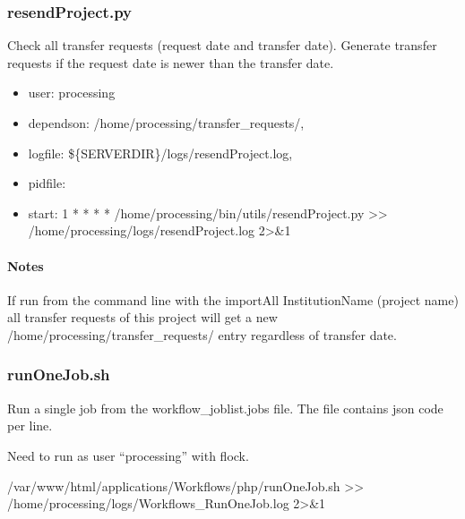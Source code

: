 \documentclass[letterpaper,10pt,english]{sphinxmanual}
\begin{document}
\subsubsection{resendProject.py}
\label{\detokenize{Architecture/scripts/resendProject:resendproject-py}}\label{\detokenize{Architecture/scripts/resendProject::doc}}
\sphinxAtStartPar
Check all transfer requests (request date and transfer date). Generate transfer requests if the request date is newer than the transfer date.
\begin{itemize}
\item {} 
\sphinxAtStartPar
user: processing

\item {} 
\sphinxAtStartPar
depends\sphinxhyphen{}on:
\sphinxhyphen{} /home/processing/transfer\_requests/,

\item {} 
\sphinxAtStartPar
log\sphinxhyphen{}file:
\sphinxhyphen{} \$\{SERVERDIR\}/logs/resendProject.log,

\item {} 
\sphinxAtStartPar
pid\sphinxhyphen{}file:

\item {} 
\sphinxAtStartPar
start:
1 * * * * /home/processing/bin/utils/resendProject.py \textgreater{}\textgreater{} /home/processing/logs/resendProject.log 2\textgreater{}\&1

\end{itemize}


\paragraph{Notes}
\label{\detokenize{Architecture/scripts/resendProject:notes}}
\sphinxAtStartPar
If run from the command line with the \textendash{}importAll InstitutionName (project name) all transfer requests of this project will get a
new /home/processing/transfer\_requests/ entry regardless of transfer date.

\sphinxstepscope


\subsubsection{runOneJob.sh}
\label{\detokenize{Architecture/scripts/runOneJob:runonejob-sh}}\label{\detokenize{Architecture/scripts/runOneJob::doc}}
\sphinxAtStartPar
Run a single job from the workflow\_joblist.jobs file. The file contains json code per line.

\sphinxAtStartPar
Need to run as user “processing” with flock.
\begin{description}
\begin{description}
\sphinxAtStartPar
/var/www/html/applications/Workflows/php/runOneJob.sh \textgreater{}\textgreater{} /home/processing/logs/Workflows\_RunOneJob.log 2\textgreater{}\&1

\end{description}

\end{description}
\end{document}
